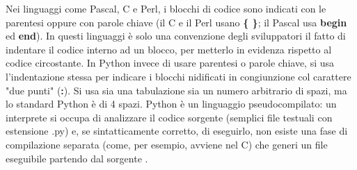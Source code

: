 %
Nei linguaggi come Pascal, C e Perl, i blocchi di codice sono indicati con le parentesi oppure con parole chiave 
(il C e il Perl usano \textbf{\{ \}}; il Pascal usa \textbf{begin} ed \textbf{end}). In questi linguaggi è solo una convenzione degli sviluppatori il fatto di 
indentare il codice interno ad un blocco, per metterlo in evidenza rispetto al codice circostante. In Python invece di usare parentesi 
o parole chiave, si usa l'indentazione stessa per indicare i blocchi nidificati in congiunzione col carattere "due punti" (\textbf{:}). 
Si usa sia una tabulazione sia un numero arbitrario di spazi, ma lo standard Python è di 4 spazi.
Python è un linguaggio pseudocompilato: un interprete si occupa di analizzare il codice sorgente (semplici file testuali con 
estensione .py) e, se sintatticamente corretto, di eseguirlo, non esiste una fase di compilazione separata (come, per esempio, 
avviene nel C) che generi un file eseguibile partendo dal sorgente \cite{python-documentation}.
%
